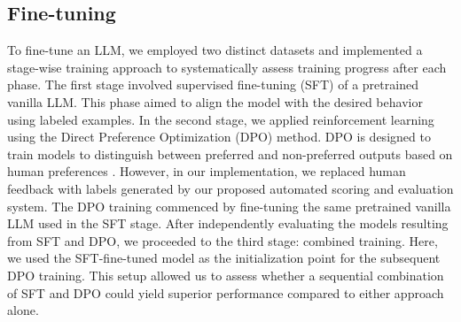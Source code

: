 \documentclass[11pt]{article}
\begin{document}
\subsection{Fine-tuning}
To fine-tune an LLM, we employed two distinct datasets and implemented a stage-wise training approach to systematically assess training progress after each phase. The first stage involved supervised fine-tuning (SFT) of a pretrained vanilla LLM. This phase aimed to align the model with the desired behavior using labeled examples. In the second stage, we applied reinforcement learning using the Direct Preference Optimization (DPO) method. DPO is designed to train models to distinguish between preferred and non-preferred outputs based on human preferences \citep{rafailov_direct_2024}. However, in our implementation, we replaced human feedback with labels generated by our proposed automated scoring and evaluation system. The DPO training commenced by fine-tuning the same pretrained vanilla LLM used in the SFT stage. After independently evaluating the models resulting from SFT and DPO, we proceeded to the third stage: combined training. Here, we used the SFT-fine-tuned model as the initialization point for the subsequent DPO training. This setup allowed us to assess whether a sequential combination of SFT and DPO could yield superior performance compared to either approach alone.
\end{document}
